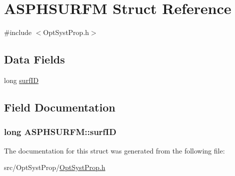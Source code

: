 \hypertarget{structASPHSURFM}{\section{A\+S\+P\+H\+S\+U\+R\+F\+M Struct Reference}
\label{structASPHSURFM}
}


{\ttfamily \#include $<$Opt\+Syst\+Prop.\+h$>$}

\subsection*{Data Fields}
\begin{DoxyCompactItemize}
\item 
long \hyperlink{structASPHSURFM_a1f7121b76f3219786afaaff57b3e6a8a}{surf\+I\+D}
\end{DoxyCompactItemize}


\subsection{Field Documentation}
\hypertarget{structASPHSURFM_a1f7121b76f3219786afaaff57b3e6a8a}{
\subsubsection[{surf\+I\+D}]{\setlength{\rightskip}{0pt plus 5cm}long A\+S\+P\+H\+S\+U\+R\+F\+M\+::surf\+I\+D}}\label{structASPHSURFM_a1f7121b76f3219786afaaff57b3e6a8a}


The documentation for this struct was generated from the following file\+:\begin{DoxyCompactItemize}
\item 
src/\+Opt\+Syst\+Prop/\hyperlink{OptSystProp_8h}{Opt\+Syst\+Prop.\+h}\end{DoxyCompactItemize}
